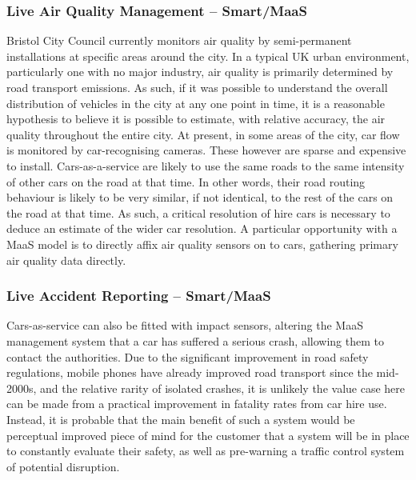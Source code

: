 \documentclass[journal]{IEEEtran}
\begin{document}
\subsubsection{Live Air Quality Management -- Smart/MaaS}

Bristol City Council currently monitors air quality by semi-permanent
installations at specific areas around the city. In a typical UK urban
environment, particularly one with no major industry, air quality is
primarily determined by road transport emissions. As such, if it was
possible to understand the overall distribution of vehicles in the
city at any one point in time, it is a reasonable hypothesis to
believe it is possible to estimate, with relative accuracy, the air
quality throughout the entire city. At present, in some areas of the
city, car flow is monitored by car-recognising cameras. These however
are sparse and expensive to install. Cars-as-a-service are likely to
use the same roads to the same intensity of other cars on the road at
that time. In other words, their road routing behaviour is likely to be
very similar, if not identical, to the rest of the cars on the road at
that time. As such, a critical resolution of hire cars is necessary to
deduce an estimate of the wider car resolution. A particular
opportunity with a MaaS model is to directly affix air quality sensors
on to cars, gathering primary air quality data directly.



\subsubsection{Live Accident Reporting -- Smart/MaaS}

Cars-as-service can also be fitted with impact sensors, altering the
MaaS management system that a car has suffered a serious crash,
allowing them to contact the authorities. Due to the significant
improvement in road safety regulations, mobile phones have already
improved road transport since the mid-2000s, and the relative rarity
of isolated crashes, it is unlikely the value case here can be made
from a practical improvement in fatality rates from car hire
use. Instead, it is probable that the main benefit of such a system
would be perceptual improved piece of mind for the customer that a
system will be in place to constantly evaluate their safety, as well
as pre-warning a traffic control system of potential disruption.
\end{document}
